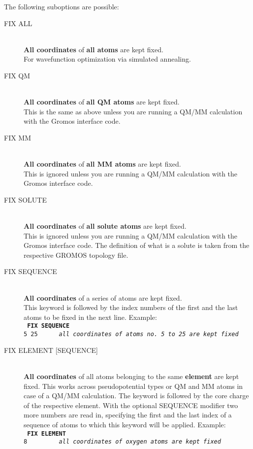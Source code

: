 \documentclass[twoside,10pt,titlepage,a4paper]{article}
\begin{document}
    The following suboptions are possible:

     \begin{description}
        \item[FIX ALL]\hfill \\
          {\bf All coordinates} of {\bf all atoms} are kept fixed.\\
           For wavefunction optimization via simulated annealing.

        \item[FIX QM]\hfill \\
          {\bf All coordinates} of {\bf all QM atoms} are kept fixed.\\
          This is the same as above unless you are running a QM/MM
          calculation with the Gromos interface code.

        \item[FIX MM]\hfill \\
          {\bf All coordinates} of {\bf all MM atoms} are kept fixed.\\
           This is ignored unless you are running a QM/MM
           calculation with the Gromos interface code.

        \item[FIX SOLUTE]\hfill \\
          {\bf All coordinates} of {\bf all solute atoms} are kept fixed.\\
           This is ignored unless you are running a QM/MM
           calculation with the Gromos interface code.
           The definition of what is a solute is taken from the
           respective GROMOS topology file.

        \item[FIX SEQUENCE]\hfill \\
          {\bf All coordinates} of a series of atoms are kept fixed.\\
          This keyword is followed by the index numbers of the first and
          the last atoms to be fixed in the next line.
          Example: \\
          {\tt
            {\bf FIX SEQUENCE}\\
            5~25~~~~~~{\small \sl all coordinates of atoms no. 5 to 25 are kept fixed}
            }

        \item[FIX ELEMENT {[SEQUENCE]}] \hfill \\
          \textbf{All coordinates} of all atoms belonging to the same
          \textbf{element} are kept fixed. This works across
          pseudopotential types or QM and MM atoms in case of a QM/MM
          calculation. The keyword is followed by the core charge of
          the respective element. With the optional SEQUENCE modifier
          two more numbers are read in, specifying the first and the
          last index of a sequence of atoms to which this keyword will
          be applied.
          Example: \\
          {\tt
            {\bf FIX ELEMENT}\\
            8~~~~~~~~~{\small \sl all coordinates of oxygen atoms are kept fixed}
            }



\end{description}
\end{document}
